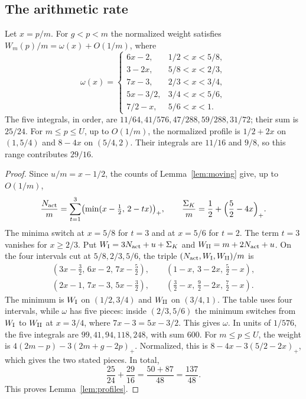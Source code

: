 \subsection{The arithmetic rate}

\begin{lemma}\label{lem:profiles}
Let \(x=p/m\). For \(g<p<m\) the normalized weight satisfies \(W_m(p)/m=\omega(x)+O(1/m)\), where
\[
 \omega(x)=
 \begin{cases}
 6x-2,&1/2<x<5/8,\\
 3-2x,&5/8<x<2/3,\\
 7x-3,&2/3<x<3/4,\\
 5x-3/2,&3/4<x<5/6,\\
 7/2-x,&5/6<x<1.
 \end{cases}
\]
The five integrals, in order, are \(11/64, 41/576, 47/288, 59/288, 31/72\); their sum is \(25/24\). For \(m\le{}p\le{}U\), up to \(O(1/m)\), the normalized profile is \(1/2+2x\) on \((1,5/4)\) and \(8-4x\) on \((5/4,2)\). Their integrals are \(11/16\) and \(9/8\), so this range contributes \(29/16\).
\end{lemma}

\begin{proof}
Since \(u/m=x-1/2\), the counts of Lemma~\ref{lem:moving} give, up to \(O(1/m)\),
\[
 \frac{N_{\rm act}}m=\sum_{t=1}^3\bigl(\min(x-\tfrac12,\,2-tx)\bigr)_+,\qquad
 \frac{\Sigma_K}m=\frac12+\Bigl(\frac52-4x\Bigr)_+ .
\]
The minima switch at \(x=5/8\) for \(t=3\) and at \(x=5/6\) for \(t=2\). The term \(t=3\) vanishes for \(x\ge2/3\). Put \(W_{\rm I}=3N_{\rm act}+u+\Sigma_K\) and \(W_{\rm II}=m+2N_{\rm act}+u\). On the four intervals cut at \(5/8,2/3,5/6\), the triple \((N_{\rm act},W_{\rm I},W_{\rm II})/m\) is
\[
\begin{gathered}
 (3x-\tfrac32,\,6x-2,\,7x-\tfrac52),\qquad
 (1-x,\,3-2x,\,\tfrac52-x),\\
 (2x-1,\,7x-3,\,5x-\tfrac32),\qquad
 (\tfrac32-x,\,\tfrac92-2x,\,\tfrac72-x).
\end{gathered}
\]
The minimum is \(W_{\rm I}\) on \((1/2,3/4)\) and \(W_{\rm II}\) on \((3/4,1)\). The table uses four intervals, while \(\omega\) has five pieces: inside \((2/3,5/6)\) the minimum switches from \(W_{\rm I}\) to \(W_{\rm II}\) at \(x=3/4\), where \(7x-3=5x-3/2\). This gives \(\omega\). In units of \(1/576\), the five integrals are \(99,41,94,118,248\), with sum \(600\). For \(m\le p\le U\), the weight is \(4(2m-p)-3(2m+g-2p)_+\). Normalized, this is \(8-4x-3(5/2-2x)_+\), which gives the two stated pieces. In total,
\[
 \frac{25}{24}+\frac{29}{16}=\frac{50+87}{48}=\frac{137}{48}.
\]
This proves Lemma~\ref{lem:profiles}.
\end{proof}

